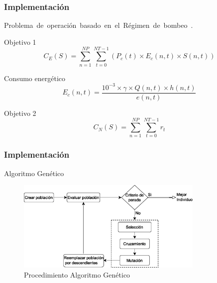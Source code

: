\documentclass[9pt]{beamer}
\begin{document}
    \begin{frame}
        \frametitle{Implementación}                       
        Problema de operación basado en el Régimen de bombeo~\citet{JHawanet-2019}.
        
        \begin{block}{Objetivo 1}
            \begin{equation*}
                C_E(S) = \sum_{n=1}^{NP}\sum_{t=0}^{NT-1}(P_c(t) \times E_c(n, t) \times S(n, t))
            \end{equation*}
        \end{block}

        \begin{block}{Consumo energético}
            \begin{equation*}
                E_c(n, t) = \frac{10^{-3} \times \gamma \times Q(n, t) \times h(n, t)}{e(n, t)}
            \end{equation*}
        \end{block}
        
        \begin{block}{Objetivo 2}
            \begin{equation*}
                C_N(S) = \sum_{n=1}^{NP}\sum_{t=0}^{NT-1}r_t
            \end{equation*}
        \end{block}
    \end{frame}

    \begin{frame}
        \frametitle{Implementación}                       
        Algoritmo Genético

        \begin{figure}
            \includegraphics[width=0.8\textwidth]{assets/AlgoritmoGenetico.eps}
            \caption{Procedimiento Algoritmo Genético~\citet{Bonelli_2016}}
        \end{figure}

    \end{frame}
\end{document}
